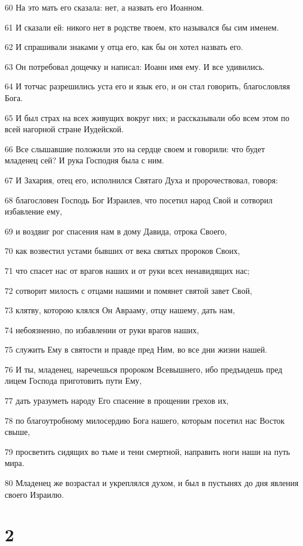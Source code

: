 \par 60 На это мать его сказала: нет, а назвать его Иоанном.
\par 61 И сказали ей: никого нет в родстве твоем, кто назывался бы сим именем.
\par 62 И спрашивали знаками у отца его, как бы он хотел назвать его.
\par 63 Он потребовал дощечку и написал: Иоанн имя ему. И все удивились.
\par 64 И тотчас разрешились уста его и язык его, и он стал говорить, благословляя Бога.
\par 65 И был страх на всех живущих вокруг них; и рассказывали обо всем этом по всей нагорной стране Иудейской.
\par 66 Все слышавшие положили это на сердце своем и говорили: что будет младенец сей? И рука Господня была с ним.
\par 67 И Захария, отец его, исполнился Святаго Духа и пророчествовал, говоря:
\par 68 благословен Господь Бог Израилев, что посетил народ Свой и сотворил избавление ему,
\par 69 и воздвиг рог спасения нам в дому Давида, отрока Своего,
\par 70 как возвестил устами бывших от века святых пророков Своих,
\par 71 что спасет нас от врагов наших и от руки всех ненавидящих нас;
\par 72 сотворит милость с отцами нашими и помянет святой завет Свой,
\par 73 клятву, которою клялся Он Аврааму, отцу нашему, дать нам,
\par 74 небоязненно, по избавлении от руки врагов наших,
\par 75 служить Ему в святости и правде пред Ним, во все дни жизни нашей.
\par 76 И ты, младенец, наречешься пророком Всевышнего, ибо предъидешь пред лицем Господа приготовить пути Ему,
\par 77 дать уразуметь народу Его спасение в прощении грехов их,
\par 78 по благоутробному милосердию Бога нашего, которым посетил нас Восток свыше,
\par 79 просветить сидящих во тьме и тени смертной, направить ноги наши на путь мира.
\par 80 Младенец же возрастал и укреплялся духом, и был в пустынях до дня явления своего Израилю.

\chapter{2}

